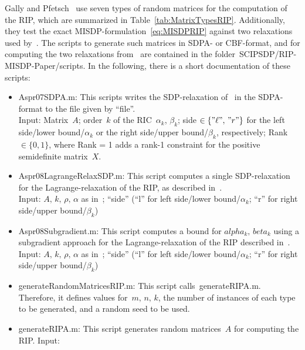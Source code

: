 \documentclass[11pt,a4paper]{article}
\newenvironment{dense_itemize}{%
  \begin{list}{$\circ$}%
    {\setlength{\topsep}{1mm}%
      \setlength{\partopsep}{0mm}%
      \setlength{\parskip}{0mm}%
      \setlength{\parsep}{0mm}%
      \setlength{\itemsep}{0mm}%
      \setlength{\labelwidth}{4mm}%
      \setlength{\leftmargin}{0mm}%
      \addtolength{\leftmargin}{\labelwidth}%
      \addtolength{\leftmargin}{\labelsep}%
      \setlength{\itemindent}{0mm}}}%
  {\end{list}}
\theoremstyle{definition}
\begin{document}
Gally and Pfetsch~\cite{GalP16} use seven types of random matrices for the
computation of the RIP, which are summarized in
Table~\ref{tab:MatrixTypesRIP}. Additionally, they test the exact
MISDP-formulation~\eqref{eq:MISDPRIP} against two relaxations used
by~\cite{dAspEtAl08,dAspEtAl07}. The scripts to generate such matrices in
SDPA- or CBF-format, and for computing the two relaxations
from~\cite{dAspEtAl08,dAspEtAl07} are contained in the
folder~\textsf{SCIPSDP/RIP-MISDP-Paper/scripts}. In the following, there is
a short documentation of these scripts:
\begin{itemize}
\item \textsf{Aspr07SDPA.m}: This scripts writes the SDP-relaxation of~\cite{dAspEtAl07} in the SDPA-format to the file given by ``file''.\\
  Input: Matrix~$A$; order~$k$ of the RIC~$\alpha_k$, $\beta_k$; side
  $\in \{"\ell",\, "r"\}$ for the left side/lower bound/$\alpha_k$ or the
  right side/upper bound/$\beta_k$, respectively; Rank $\in \{0,1\}$, where
  Rank = 1 adds a rank-1 constraint for the positive semidefinite
  matrix~$X$.
\item \textsf{Aspr08LagrangeRelaxSDP.m}: This script computes a single
  SDP-relaxation for the Lagrange-relaxation of the RIP, as described
  in~\cite{dAspEtAl08}.\\
  Input: $A,\, k,\, \rho,\, \alpha$ as in~\cite{dAspEtAl08}; ``side''
  (``l'' for left side/lower bound/$\alpha_k$; ``r'' for right
  side/upper bound/$\beta_k$)
\item \textsf{Aspr08Subgradient.m}: This script computes a bound for
  $alpha_k, \, beta_k$ using a subgradient approach for the
  Lagrange-relaxation of the RIP described in~\cite{dAspEtAl08}.\\
  Input: $A,\, k,\, \rho,\, \alpha$ as in~\cite{dAspEtAl08}; ``side''
  (``l'' for left side/lower bound/$\alpha_k$; ``r'' for right
  side/upper bound/$\beta_k$)
\item \textsf{generateRandomMatricesRIP.m}: This script
  calls~\textsf{generateRIPA.m}. Therefore, it defines values
  for~$m,\, n,\, k$, the number of instances of each type to be generated,
  and a random seed to be used.
\item \textsf{generateRIPA.m}: This script generates random matrices~$A$
  for computing the RIP. Input:
\end{itemize}
\end{document}
